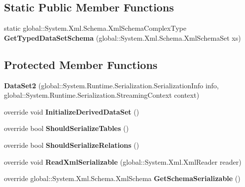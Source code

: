 \subsection*{Static Public Member Functions}
\begin{CompactItemize}
\item 
static global::System.Xml.Schema.XmlSchemaComplexType \textbf{GetTypedDataSetSchema} (global::System.Xml.Schema.XmlSchemaSet xs)\label{class_automatic_medical_system_1_1_data_set2_b1eedfc76caeae7e9b107c84bf316a62}

\end{CompactItemize}
\subsection*{Protected Member Functions}
\begin{CompactItemize}
\item 
\textbf{DataSet2} (global::System.Runtime.Serialization.SerializationInfo info, global::System.Runtime.Serialization.StreamingContext context)\label{class_automatic_medical_system_1_1_data_set2_b8800bcd4098be80626c69331be1942b}

\item 
override void \textbf{InitializeDerivedDataSet} ()\label{class_automatic_medical_system_1_1_data_set2_7c0c1073e9e96ea5feb0f9f6ff9b0f7b}

\item 
override bool \textbf{ShouldSerializeTables} ()\label{class_automatic_medical_system_1_1_data_set2_7f8263d0946b04206b97a1006aaac997}

\item 
override bool \textbf{ShouldSerializeRelations} ()\label{class_automatic_medical_system_1_1_data_set2_103a2cbfddf7fccb450498bd7b10e8af}

\item 
override void \textbf{ReadXmlSerializable} (global::System.Xml.XmlReader reader)\label{class_automatic_medical_system_1_1_data_set2_bcf022acf60ab93006d73dbfa89b8056}

\item 
override global::System.Xml.Schema.XmlSchema \textbf{GetSchemaSerializable} ()\label{class_automatic_medical_system_1_1_data_set2_6d07cc618aabcc7a6cf5fb9f6c8192e0}

\end{CompactItemize}
